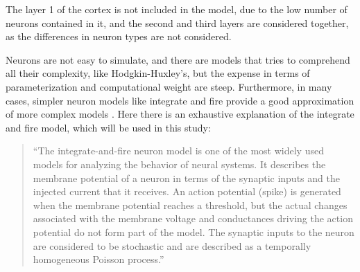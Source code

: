 The layer 1 of the cortex is not included in the model, due to the low number of neurons contained in it, and the second and third layers are considered together, as the differences in neuron types are not considered.


Neurons are not easy to simulate, and there are models that tries to comprehend all their complexity, like Hodgkin-Huxley's, but the expense in terms of parameterization and computational weight are steep. Furthermore, in many cases, simpler neuron models like integrate and fire provide a good approximation of more complex models \cite{bernander}.  Here there is an exhaustive explanation of the integrate and fire model, which will be used in this study: 
\begin{quote}
``The integrate-and-fire neuron model is one of the most widely used models for analyzing the behavior of neural systems. It describes the membrane potential of a neuron in terms of the synaptic inputs and the injected current that it receives. An action potential (spike) is generated when the membrane potential reaches a threshold, but the actual changes associated with the membrane voltage and conductances driving the action potential do not form part of the model. The synaptic inputs to the neuron are considered to be stochastic and are described as a temporally homogeneous Poisson process.''
\begin{flushright}
\cite{burkitt}
\end{flushright}
\end{quote}



